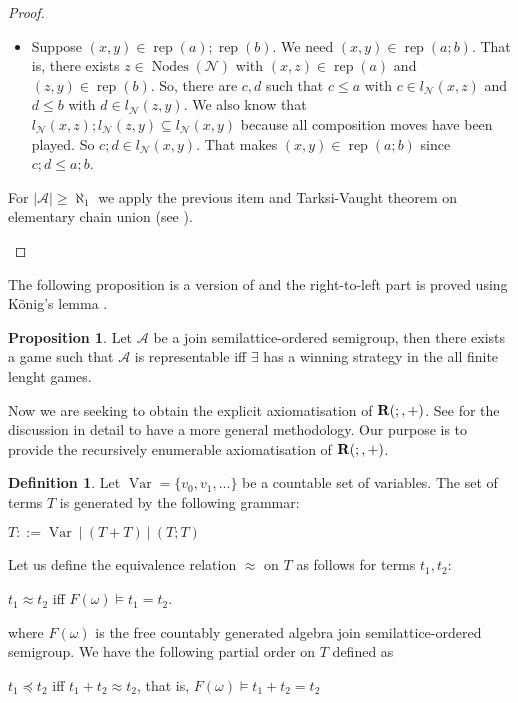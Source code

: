 \documentclass[a4paper]{article}
\theoremstyle{definition}
\newtheorem{definition}{Definition}
\theoremstyle{theorem}
\theoremstyle{proposition}
\newtheorem{proposition}{Proposition}
\theoremstyle{lemma}
\theoremstyle{ex}
\theoremstyle{corollary}
\theoremstyle{claim}
\begin{document}
\begin{proof}
\begin{enumerate}
\begin{itemize}
\item Suppose $(x, y) \in \operatorname{rep}(a) ; \operatorname{rep}(b)$. We need $(x, y) \in \operatorname{rep}(a;b)$. That is, there exists $z \in \operatorname{Nodes}(\mathcal{N})$ with $(x, z) \in \operatorname{rep}(a)$ and $(z, y) \in \operatorname{rep}(b)$. So, there are $c, d$ such that $c \leq a$ with $c \in l_{\mathcal{N}}(x, z)$ and $d \leq b$ with $d \in l_{\mathcal{N}}(z, y)$.
We also know that $l_{\mathcal{N}}(x, z) ; l_{\mathcal{N}}(z, y) \subseteq l_{\mathcal{N}}(x, y)$ because all composition moves have been played.
So $c ; d \in l_{\mathcal{N}}(x, y)$. That makes $(x, y) \in \operatorname{rep}(a;b)$ since $c ; d \leq a ; b$.

\end{itemize}
For $|\mathcal{A}| \geq \aleph_1$ we apply the previous item and Tarksi-Vaught theorem on elementary chain union (see \cite[Theorem 2.5.2]{hodges1997shorter}).
  \end{enumerate}
\end{proof}

The following proposition is a version of \cite[Proposition 7.24]{hirsch2002relation} and the right-to-left part is proved using K\"{o}nig's lemma \cite[Exercise 5.6.3]{hodges1997shorter}.

\begin{proposition}
  Let $\mathcal{A}$ be a join semilattice-ordered semigroup, then there exists a game such that $\mathcal{A}$ is representable iff $\exists$ has a winning strategy in the all finite lenght games.
\end{proposition}

Now we are seeking to obtain the explicit axiomatisation of ${\bf R}(;, +)$. See \cite[Chapter 9]{hirsch2002relation} for the discussion in detail to have a more general methodology. Our purpose is to provide the recursively enumerable axiomatisation of ${\bf R}(;, +)$.

\begin{definition}
  Let $\operatorname{Var} = \{ v_0, v_1, ... \}$ be a countable set of variables. The set of terms $T$ is generated by the following grammar:

  \begin{center}
    $T ::= \operatorname{Var} \: | \: (T + T) \: | \: (T ; T)$
  \end{center}
\end{definition}

Let us define the equivalence relation $\approx$ on $T$ as follows for terms $t_1, t_2$:
\begin{center}
$t_1 \approx t_2$ iff $F(\omega) \models t_1 = t_2$.
\end{center}
where $F(\omega)$ is the free countably generated algebra join semilattice-ordered semigroup.
We have the following partial order on $T$ defined as
\begin{center}
  $t_1 \preceq t_2$ iff $t_1 + t_2 \approx t_2$, that is, $F(\omega) \models t_1 + t_2 = t_2$
\end{center}
\end{document}
